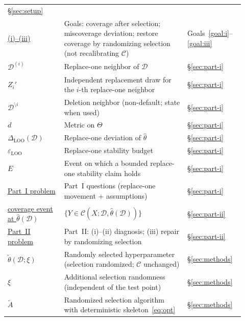 \documentclass[12pt]{article}
\theoremstyle{plain}
\begin{document}
\begin{center}
\begin{longtable}{@{}>{\raggedright\arraybackslash}p{0.22\linewidth}
                  >{\raggedright\arraybackslash}p{0.48\linewidth}
                  >{\raggedright\arraybackslash}p{0.22\linewidth}@{}}
  \hyperref[def:Delta-mc]{\S\ref{sec:setup}} \\
\hyperref[goal:i]{(i)--(iii)} &
  Goals: coverage after selection; miscoverage deviation; restore coverage by randomizing selection (not recalibrating $\mathcal{C}$) &
  Goals~\ref{goal:i}--\ref{goal:iii} \\
\hyperref[def:D-loo]{$\mathcal{D}^{(i)}$} &
  Replace-one neighbor of $\mathcal{D}$ &
  \hyperref[def:D-loo]{\S\ref{sec:part-i}} \\
\hyperref[def:D-loo]{$Z_i'$} &
  Independent replacement draw for the $i$-th replace-one neighbor &
  \hyperref[def:D-loo]{\S\ref{sec:part-i}} \\
\hyperref[def:D-loo]{$\mathcal{D}^{\setminus i}$} &
  Deletion neighbor (non-default; state when used) &
  \hyperref[def:D-loo]{\S\ref{sec:part-i}} \\
\hyperref[def:d-Theta]{$d$} &
  Metric on $\Theta$ &
  \hyperref[def:d-Theta]{\S\ref{sec:part-i}} \\
\hyperref[def:Delta-LOO]{$\Delta_{\mathrm{LOO}}(\mathcal{D})$} &
  Replace-one deviation of $\hat\theta$ &
  \hyperref[def:Delta-LOO]{\S\ref{sec:part-i}} \\
\hyperref[def:bounded-LOO]{$\varepsilon_{\mathrm{LOO}}$} &
  Replace-one stability budget &
  \hyperref[def:bounded-LOO]{\S\ref{sec:part-i}} \\
\hyperref[def:bounded-LOO]{$E$} &
  Event on which a bounded replace-one stability claim holds &
  \hyperref[def:bounded-LOO]{\S\ref{sec:part-i}} \\
\hyperref[prob:part-i]{Part~I problem} &
  Part~I questions (replace-one movement + assumptions) &
  \hyperref[prob:part-i]{\S\ref{sec:part-i}} \\
\hyperref[def:plugin]{coverage event at $\hat\theta(\mathcal{D})$} &
  $\{Y\in\mathcal{C}(X;\mathcal{D},\hat\theta(\mathcal{D}))\}$ &
  \hyperref[def:plugin]{\S\ref{sec:part-ii}} \\
\hyperref[prob:part-ii]{Part~II problem} &
  Part~II: (i)--(ii) diagnosis; (iii) repair by randomizing selection &
  \hyperref[prob:part-ii]{\S\ref{sec:part-ii}} \\
\hyperref[def:thetatilde]{$\widetilde\theta(\mathcal{D};\xi)$} &
  Randomly selected hyperparameter (selection randomized; $\mathcal{C}$ unchanged) &
  \hyperref[def:thetatilde]{\S\ref{sec:methods}} \\
\hyperref[def:thetatilde]{$\xi$} &
  Additional selection randomness (independent of the test point) &
  \hyperref[def:thetatilde]{\S\ref{sec:methods}} \\
\hyperref[def:thetatilde]{$\widetilde A$} &
  Randomized selection algorithm with deterministic skeleton~\eqref{eq:opt} &
  \hyperref[def:thetatilde]{\S\ref{sec:methods}} \\
\end{longtable}
\end{center}
\end{document}
